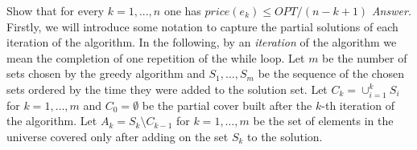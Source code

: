 \documentclass[10pt]{article}
\newcommand{\Fcal}{\mathcal{F}}
\newenvironment{exercise}[2][Exercise]{\begin{trivlist}
  \item[\hskip \labelsep {\bfseries #1}\hskip \labelsep {\bfseries #2.}]}{\end{trivlist}}
\begin{document}
%
\newpage
  \begin{exercise}{3a} Show that for every $k = 1,...,n$ one has $price(e_k) \leq OPT/(n-k+1)$ \newline
  \emph{Answer.}
    Firstly, we will introduce some notation to capture the partial solutions of
    each iteration of the algorithm. In the following, by an \textit{iteration}
    of the algorithm we mean the completion of one repetition of the while loop.
    Let $m$ be the number of sets chosen by the
    greedy algorithm and $S_1, \ldots, S_m$ be the sequence of the chosen sets
    ordered by the time they were added to the solution set.
    Let $C_k = \cup_{i=1}^k S_i$ for $k = 1, \ldots, m$ and $C_0 = \emptyset$
    be the partial cover built after the $k$-th iteration of the algorithm.
    Let $A_k = S_k \setminus C_{k - 1}$ for $k=  1,
    \ldots, m$ be the set of elements in
    the universe covered only after adding on the set $S_k$ to the solution.

\end{exercise}
\end{document}
